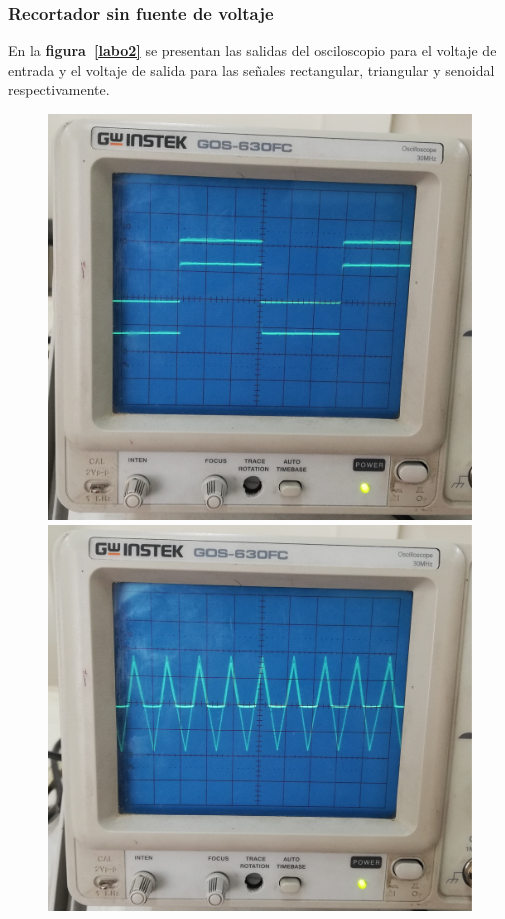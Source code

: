 \documentclass[letter,twoside,11pt]{article}
\begin{document}
\subsubsection{Recortador sin fuente de voltaje}
En la \textbf{figura~\ref{labo2}} se presentan las salidas del osciloscopio para
el voltaje de entrada y el voltaje de salida para las señales rectangular,
triangular y senoidal respectivamente.

\begin{figure}[!h]
\centering
\includegraphics[scale=0.077]{fotos/labo1.2.eps}
\includegraphics[scale=0.070]{fotos/labo1.3.eps}

\end{figure}
\end{document}
